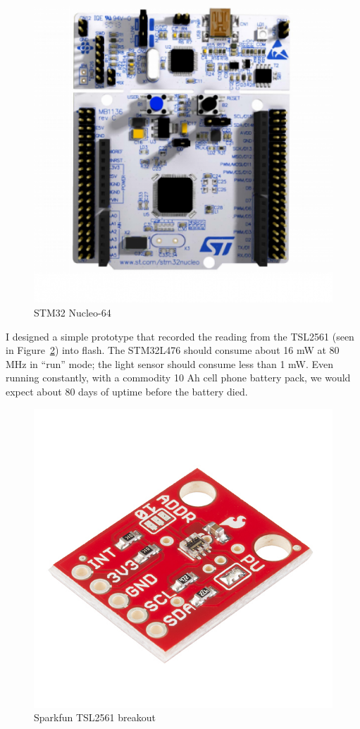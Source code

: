 \documentclass{article}
\begin{document}
\begin{figure}[h]
  \centering
  \includegraphics[scale=0.5]{nucleo_64_stm32f303re}
  \caption{STM32 Nucleo-64} \label{fig:nucleo}
\end{figure}

I designed a simple prototype that recorded the reading from the TSL2561 (seen in Figure~\ref{fig:tsl2561}) into flash. The STM32L476 should consume about 16 mW at 80 MHz in ``run'' mode; the light sensor should consume less than 1 mW. Even running constantly, with a commodity 10 Ah cell phone battery pack, we would expect about 80 days of uptime before the battery died.

\begin{figure}[h]
  \centering
  \includegraphics[scale=0.25]{sparkfun_tsl2561}
  \caption{Sparkfun TSL2561 breakout} \label{fig:tsl2561}
\end{figure}
\end{document}
